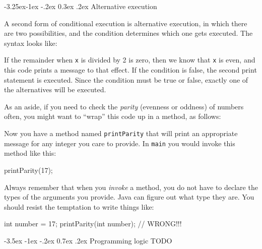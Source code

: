 \documentclass[12pt]{book}
\makeatletter
\renewcommand{\section}{\@startsection {section}{1}{\z@}%
    {-3.5ex \@plus -1ex \@minus -.2ex}%
    {0.7ex \@plus.2ex}%
    {\normalfont\Large\bfseries}}
\renewcommand\subsection{\@startsection{subsection}{2}{\z@}%
    {-3.25ex\@plus -1ex \@minus -.2ex}%
    {0.3ex \@plus .2ex}%
    {\normalfont\large\bfseries}}
\theoremstyle{exercise}
\makeatother
\begin{document}
\subsection{Alternative execution}
\label{alternative}


A second form of conditional execution is alternative execution, in which there are two possibilities, and the condition determines which one gets executed.
The syntax looks like:


If the remainder when {\tt x} is divided by 2 is zero, then we know that {\tt x} is even, and this code prints a message to that effect.
If the condition is false, the second print statement is executed.
Since the condition must be true or false, exactly one of the alternatives will be executed.

As an aside, if you need to check the {\em parity} (evenness or oddness) of numbers often, you might want to ``wrap'' this code up in a method, as follows:


Now you have a method named {\tt printParity} that will print an appropriate message for any integer you care to provide.
In {\tt main} you would invoke this method like this:

\begin{code}
    printParity(17);
\end{code}

Always remember that when you {\em invoke} a method, you do not have to declare the types of the arguments you provide.
Java can figure out what type they are.
You should resist the temptation to write things like:

\begin{code}
    int number = 17;
    printParity(int number);        // WRONG!!!
\end{code}


\section{Programming logic}
TODO
\end{document}
